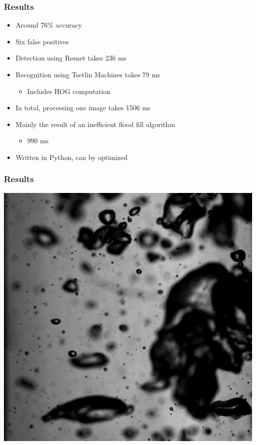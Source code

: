 \documentclass{beamer}
\begin{document}
\begin{frame}
    \frametitle{Results}

    \begin{itemize}
        \item Around 76\% accuracy
        \item Six false positives
        \item Detection using Resnet takes 236 ms
        \item Recognition using Tsetlin Machines takes 79 ms
        \begin{itemize}
            \item Includes HOG computation
        \end{itemize}
        \item In total, processing one image takes 1506 ms
        \item Mainly the result of an inefficient flood fill algorithm
        \begin{itemize}
            \item 990 ms
        \end{itemize}
        \item Written in Python, can by optimized
    \end{itemize}

\end{frame}

\begin{frame}
    \frametitle{Results}
    \begin{center}
        \includegraphics[width=0.8\columnwidth]{orig-img}
    \end{center}
\end{frame}
\end{document}
